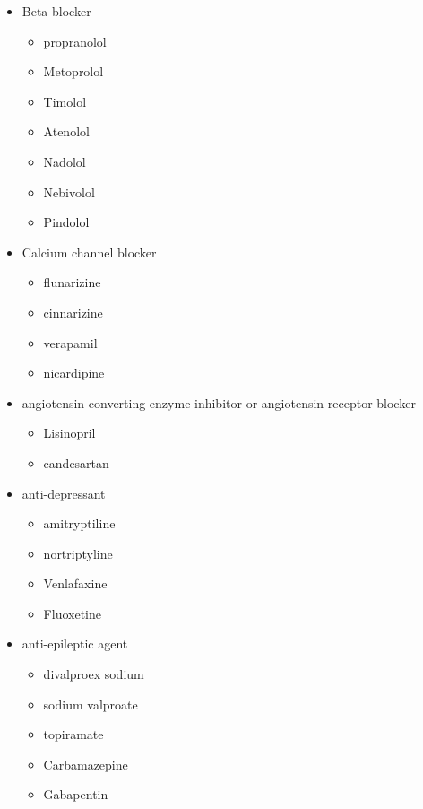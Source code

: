\documentclass[]{book}
\providecommand{\tightlist}{%
  \setlength{\itemsep}{0pt}\setlength{\parskip}{0pt}}
\begin{document}
\begin{itemize}
\item
  Beta blocker

  \begin{itemize}
  \tightlist
  \item
    propranolol
  \item
    Metoprolol
  \item
    Timolol
  \item
    Atenolol
  \item
    Nadolol
  \item
    Nebivolol
  \item
    Pindolol
  \end{itemize}
\item
  Calcium channel blocker

  \begin{itemize}
  \tightlist
  \item
    flunarizine
  \item
    cinnarizine
  \item
    verapamil
  \item
    nicardipine
  \end{itemize}
\item
  angiotensin converting enzyme inhibitor or angiotensin receptor blocker

  \begin{itemize}
  \tightlist
  \item
    Lisinopril
  \item
    candesartan
  \end{itemize}
\item
  anti-depressant

  \begin{itemize}
  \tightlist
  \item
    amitryptiline
  \item
    nortriptyline
  \item
    Venlafaxine
  \item
    Fluoxetine
  \end{itemize}
\item
  anti-epileptic agent

  \begin{itemize}
  \tightlist
  \item
    divalproex sodium
  \item
    sodium valproate
  \item
    topiramate
  \item
    Carbamazepine
  \item
    Gabapentin
  \end{itemize}
\end{itemize}
\end{document}
